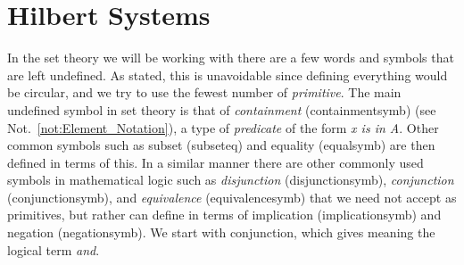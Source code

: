 \section{Hilbert Systems}
    In the set theory we will be working with there are a few words and symbols
    that are left undefined. As stated, this is unavoidable since defining
    everything would be circular, and we try to use the fewest number of
    \textit{primitive}. The main undefined symbol in set theory is that of
    \textit{containment} (\gls{containmentsymb})
    (see Not.~\ref{not:Element_Notation}), a type of
    \textit{\gls{predicate}} of the form \textit{x is in A}.
    Other common symbols such as subset (\gls{subseteq}) and equality
    (\gls{equalsymb}) are then defined in terms of this. In a similar manner
    there are other commonly used symbols in mathematical logic such as
    \textit{disjunction} (\gls{disjunctionsymb}), \textit{conjunction}
    (\gls{conjunctionsymb}), and \textit{equivalence} (\gls{equivalencesymb})
    that we need not accept as primitives, but rather can define in terms of
    implication (\gls{implicationsymb}) and negation (\gls{negationsymb}). We
    start with conjunction, which gives meaning the logical term \textit{and}.

